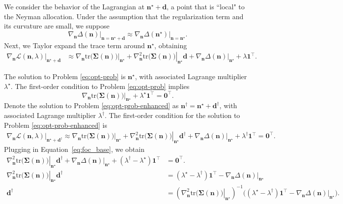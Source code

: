 \documentclass{article}
\newcommand{\bsSig}{\boldsymbol  \Sigma}
\newcommand{\bsn}{\boldsymbol n}
\newcommand{\bsns}{\boldsymbol{n^\star}}
\newcommand{\bsnd}{\boldsymbol{n^\dag}}
\newcommand{\bsd}{\boldsymbol{d}}
\newcommand{\bsdd}{\boldsymbol{d^\dag}}
\newcommand{\Tr}{\text{tr}}
\begin{document}
We consider the behavior of the Lagrangian at $\bsns + \bsd$, a point that is ``local" to the Neyman allocation. Under the assumption that the regularization term and its curvature are small, we suppose 
\[ \left. \nabla_{\bsn} \Delta (\bsn) \right|_{\bsn=\bsns + \bsd} \approx \left. \nabla_{\bsn} \Delta (\bsns)\right|_{\bsn=\bsns}.\] 
Next, we Taylor expand the trace term around $\boldsymbol{n^\star}$, obtaining
\begin{align*}
\left.\nabla_{\bsn}\mathcal{L}(\bsn, \lambda)\right|_{\bsns + \bsd} & \approx \left. \nabla_{\bsn} \Tr\big(\bsSig(\bsn)\big)\right|_{\bsns} + \left. \nabla_{\bsn}^2 \Tr\big(\bsSig(\bsn)\big)\right|_{\bsns} \bsd +  \left. \nabla_{\bsn} \Delta (\bsn)\right|_{\bsns} + \lambda \boldsymbol 1^\top.
\end{align*}

The solution to Problem \ref{eq:opt-prob} is $\bsns$, with associated Lagrange multiplier $\lambda^\star$. The first-order condition to Problem \ref{eq:opt-prob} implies 
\begin{equation}\label{eq:foc_base}
\left. \nabla_{\bsn} \Tr\big(\bsSig(\bsn)\big)\right|_{\bsns} + \lambda^\star \boldsymbol 1^\top = \boldsymbol 0^\top.
\end{equation}
Denote the solution to Problem \ref{eq:opt-prob-enhanced} as $\bsnd = \bsns + \bsdd$, with associated Lagrange multiplier $\lambda^\dag$. The first-order condition for the  solution to Problem \ref{eq:opt-prob-enhanced} is
\begin{align*}
\left.\nabla_{\bsn}\mathcal{L}(\bsn, \lambda)\right|_{\bsns + \bsdd} \approx \left. \nabla_{\bsn} \Tr\big(\bsSig(\bsn)\big)\right|_{\bsns} + \left. \nabla_{\bsn}^2 \Tr\big(\bsSig(\bsn)\big)\right|_{\bsns} \bsdd +  \left. \nabla_{\bsn} \Delta (\bsn)\right|_{\bsns} + \lambda^\dag \boldsymbol 1^\top = \boldsymbol 0^\top.
\end{align*}
Plugging in Equation~\eqref{eq:foc_base}, we obtain 
\begin{align*}
\left. \nabla_{\bsn}^2 \Tr\big(\bsSig(\bsn)\big)\right|_{\bsns} \bsdd +  \left. \nabla_{\bsn} \Delta (\bsn)\right|_{\bsns} + \left(\lambda^\dag - \lambda^\star \right) \boldsymbol 1^\top &= \boldsymbol 0^\top. \\
\left. \nabla_{\bsn}^2 \Tr\big(\bsSig(\bsn)\big)\right|_{\bsns} \bsdd &= \left(\lambda^\star - \lambda^\dag \right) \boldsymbol 1^\top - \left. \nabla_{\bsn} \Delta (\bsn)\right|_{\bsns} \\
\bsdd &= \left( \left. \nabla_{\bsn}^2 \Tr\big(\bsSig(\bsn)\big)\right|_{\bsns} \right)^{-1} \bigg(\left(\lambda^\star - \lambda^\dag \right) \boldsymbol 1^\top - \left. \nabla_{\bsn} \Delta (\bsn)\right|_{\bsns} \bigg).
\end{align*}
\end{document}
